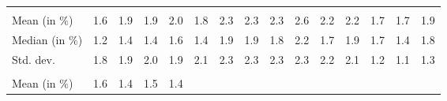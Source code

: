 \begin{tabular}{lllllllllllllll}
  \multicolumn{1}{r}{} &
  \multicolumn{1}{r}{} &
  \multicolumn{1}{r}{} &
  \multicolumn{1}{r}{} &
  \multicolumn{1}{r}{} &
  \multicolumn{1}{r}{} &
  \multicolumn{1}{r}{} &
  \multicolumn{1}{r}{} &
  \multicolumn{1}{r}{} &
  \multicolumn{1}{r}{} &
  \multicolumn{1}{r}{} \\
\multicolumn{1}{l}{\hspace{2em}Mean (in $\%$)} &
  \multicolumn{1}{|r}{1.6} &
  \multicolumn{1}{r}{1.9} &
  \multicolumn{1}{r}{1.9} &
  \multicolumn{1}{r}{2.0} &
  \multicolumn{1}{r}{1.8} &
  \multicolumn{1}{r}{2.3} &
  \multicolumn{1}{r}{2.3} &
  \multicolumn{1}{r}{2.3} &
  \multicolumn{1}{r}{2.6} &
  \multicolumn{1}{r}{2.2} &
  \multicolumn{1}{r}{2.2} &
  \multicolumn{1}{r}{1.7} &
  \multicolumn{1}{r}{1.7} &
  \multicolumn{1}{r}{1.9} \\
\multicolumn{1}{l}{\hspace{2em}Median (in $\%$)} &
  \multicolumn{1}{|r}{1.2} &
  \multicolumn{1}{r}{1.4} &
  \multicolumn{1}{r}{1.4} &
  \multicolumn{1}{r}{1.6} &
  \multicolumn{1}{r}{1.4} &
  \multicolumn{1}{r}{1.9} &
  \multicolumn{1}{r}{1.9} &
  \multicolumn{1}{r}{1.8} &
  \multicolumn{1}{r}{2.2} &
  \multicolumn{1}{r}{1.7} &
  \multicolumn{1}{r}{1.9} &
  \multicolumn{1}{r}{1.7} &
  \multicolumn{1}{r}{1.4} &
  \multicolumn{1}{r}{1.8} \\
\multicolumn{1}{l}{\hspace{2em}Std. dev.} &
  \multicolumn{1}{|r}{1.8} &
  \multicolumn{1}{r}{1.9} &
  \multicolumn{1}{r}{2.0} &
  \multicolumn{1}{r}{1.9} &
  \multicolumn{1}{r}{2.1} &
  \multicolumn{1}{r}{2.3} &
  \multicolumn{1}{r}{2.3} &
  \multicolumn{1}{r}{2.3} &
  \multicolumn{1}{r}{2.3} &
  \multicolumn{1}{r}{2.2} &
  \multicolumn{1}{r}{2.1} &
  \multicolumn{1}{r}{1.2} &
  \multicolumn{1}{r}{1.1} &
  \multicolumn{1}{r}{1.3} \\
\multicolumn{1}{l}{\hspace{1em}{\textit{Additive term} ($\widehat{t}/\widetilde{p}$)}} &
  \multicolumn{1}{|r}{} &
  \multicolumn{1}{r}{} &
  \multicolumn{1}{r}{} &
  \multicolumn{1}{r}{} &
  \multicolumn{1}{r}{} &
  \multicolumn{1}{r}{} &
  \multicolumn{1}{r}{} &
  \multicolumn{1}{r}{} &
  \multicolumn{1}{r}{} &
  \multicolumn{1}{r}{} &
  \multicolumn{1}{r}{} &
  \multicolumn{1}{r}{} &
  \multicolumn{1}{r}{} &
  \multicolumn{1}{r}{} \\
\multicolumn{1}{l}{\hspace{2em}Mean (in $\%$)} &
  \multicolumn{1}{|r}{1.6} &
  \multicolumn{1}{r}{1.4} &
  \multicolumn{1}{r}{1.5} &
  \multicolumn{1}{r}{1.4} &

\end{tabular}
